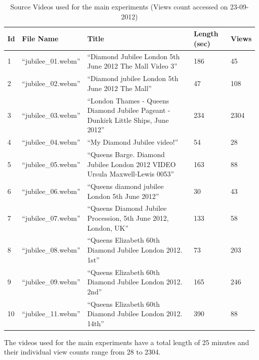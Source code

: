 \begin{table}
   \begin{tabular}{ | l | l | p{8cm} | p{1.3cm} | l |}
     \hline
     \textbf{Id} & \textbf{File Name}	          & \textbf{Title}	  & \textbf{Length (sec)} & \textbf{Views} \\ \hline
     1	 & ``jubilee\_01.webm''	& ``Diamond Jubilee London 5th June 2012 The Mall Video 3'' & 186                             & 45   \\ \hline
     2	 & ``jubilee\_02.webm''	& ``Diamond jubilee London 5th June 2012 The Mall'' & 47                                      & 108  \\ \hline
     3	 & ``jubilee\_03.webm''	& ``London Thames - Queens Diamond Jubilee Pageant - Dunkirk Little Ships, June 2012'' & 234  & 2304\\ \hline
     4	 & ``jubilee\_04.webm''	& ``My Diamond Jubilee video!'' & 54                                                          & 28   \\ \hline
     5	 & ``jubilee\_05.webm''	& ``Queens Barge. Diamond Jubilee London 2012 VIDEO Ursula Maxwell-Lewis 0053'' & 163         & 88   \\ \hline
     6	 & ``jubilee\_06.webm''	& ``Queens diamond jubilee London 5th June 2012'' & 30                                        & 43   \\ \hline
     7	 & ``jubilee\_07.webm''	& ``Queens Diamond Jubilee Procession, 5th June 2012, London, UK'' & 133                      & 58   \\ \hline
     8	 & ``jubilee\_08.webm''	& ``Queens Elizabeth 60th Diamond Jubilee London 2012. 1st'' & 73                             & 203  \\ \hline
     9	 & ``jubilee\_09.webm''	& ``Queens Elizabeth 60th Diamond Jubilee London 2012. 2nd'' & 165                            & 246  \\ \hline
     10 & ``jubilee\_11.webm''	& ``Queens Elizabeth 60th Diamond Jubilee London 2012. 14th'' & 390                           & 88   \\ \hline
   \end{tabular}
   \caption{Source Videos used for the main experiments (Views count accessed on 23-09-2012)}
   \label{videos}
\end{table}

The videos used for the main experiments have a total length of 25 minutes and their individual view counts range from 28 to 2304. 


